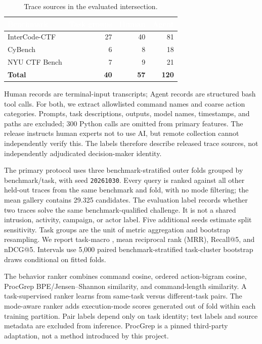 \begin{table}[t]
\centering
\caption{Trace sources in the evaluated intersection.}
\label{tab:data}
\small
{}
\begin{tabularx}{0.84\linewidth}{>{\raggedright\arraybackslash}Xrrr}
\toprule
\rowcolor{InkBlue}\textcolor{white}{Benchmark} & \textcolor{white}{Task groups} & \textcolor{white}{Human} & \textcolor{white}{Agent} \\
\midrule
InterCode-CTF & 27 & 40 & 81 \\
CyBench & 6 & 8 & 18 \\
NYU CTF Bench & 7 & 9 & 21 \\
\rowcolor{PaleBlue}\textbf{Total} & \textbf{40} & \textbf{57} & \textbf{120} \\
\bottomrule
\end{tabularx}
\end{table}

Human records are terminal-input transcripts; Agent records are structured bash tool calls. For both, we extract allowlisted command names and coarse action categories. Prompts, task descriptions, outputs, model names, timestamps, and paths are excluded; 300 Python calls are omitted from primary features. The release instructs human experts not to use AI, but remote collection cannot independently verify this. The labels therefore describe released trace sources, not independently adjudicated decision-maker identity.

The primary protocol uses three benchmark-stratified outer folds grouped by benchmark/task, with seed \texttt{20261030}. Every query is ranked against all other held-out traces from the same benchmark and fold, with no mode filtering; the mean gallery contains 29.325 candidates. The evaluation label records whether two traces solve the same benchmark-qualified challenge. It is not a shared intrusion, activity, campaign, or actor label. Five additional seeds estimate split sensitivity. Task groups are the unit of metric aggregation and bootstrap resampling. We report task-macro \Hit, mean reciprocal rank (MRR), Recall@5, and nDCG@5. Intervals use 5,000 paired benchmark-stratified task-cluster bootstrap draws conditional on fitted folds.

The behavior ranker combines command cosine, ordered action-bigram cosine, ProcGrep BPE/Jensen--Shannon similarity, and command-length similarity. A task-supervised ranker learns from same-task versus different-task pairs. The mode-aware ranker adds execution-mode scores generated out of fold within each training partition. Pair labels depend only on task identity; test labels and source metadata are excluded from inference. ProcGrep is a pinned third-party adaptation, not a method introduced by this project.


